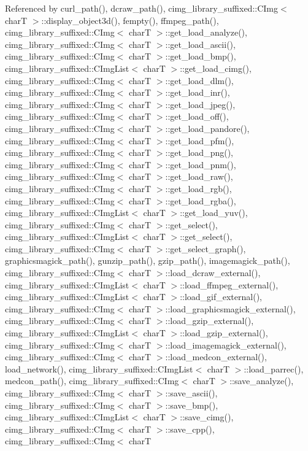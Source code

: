 Referenced by curl\+\_\+path(), dcraw\+\_\+path(), cimg\+\_\+library\+\_\+suffixed\+::\+C\+Img$<$ char\+T $>$\+::display\+\_\+object3d(), fempty(), ffmpeg\+\_\+path(), cimg\+\_\+library\+\_\+suffixed\+::\+C\+Img$<$ char\+T $>$\+::get\+\_\+load\+\_\+analyze(), cimg\+\_\+library\+\_\+suffixed\+::\+C\+Img$<$ char\+T $>$\+::get\+\_\+load\+\_\+ascii(), cimg\+\_\+library\+\_\+suffixed\+::\+C\+Img$<$ char\+T $>$\+::get\+\_\+load\+\_\+bmp(), cimg\+\_\+library\+\_\+suffixed\+::\+C\+Img\+List$<$ char\+T $>$\+::get\+\_\+load\+\_\+cimg(), cimg\+\_\+library\+\_\+suffixed\+::\+C\+Img$<$ char\+T $>$\+::get\+\_\+load\+\_\+dlm(), cimg\+\_\+library\+\_\+suffixed\+::\+C\+Img$<$ char\+T $>$\+::get\+\_\+load\+\_\+inr(), cimg\+\_\+library\+\_\+suffixed\+::\+C\+Img$<$ char\+T $>$\+::get\+\_\+load\+\_\+jpeg(), cimg\+\_\+library\+\_\+suffixed\+::\+C\+Img$<$ char\+T $>$\+::get\+\_\+load\+\_\+off(), cimg\+\_\+library\+\_\+suffixed\+::\+C\+Img$<$ char\+T $>$\+::get\+\_\+load\+\_\+pandore(), cimg\+\_\+library\+\_\+suffixed\+::\+C\+Img$<$ char\+T $>$\+::get\+\_\+load\+\_\+pfm(), cimg\+\_\+library\+\_\+suffixed\+::\+C\+Img$<$ char\+T $>$\+::get\+\_\+load\+\_\+png(), cimg\+\_\+library\+\_\+suffixed\+::\+C\+Img$<$ char\+T $>$\+::get\+\_\+load\+\_\+pnm(), cimg\+\_\+library\+\_\+suffixed\+::\+C\+Img$<$ char\+T $>$\+::get\+\_\+load\+\_\+raw(), cimg\+\_\+library\+\_\+suffixed\+::\+C\+Img$<$ char\+T $>$\+::get\+\_\+load\+\_\+rgb(), cimg\+\_\+library\+\_\+suffixed\+::\+C\+Img$<$ char\+T $>$\+::get\+\_\+load\+\_\+rgba(), cimg\+\_\+library\+\_\+suffixed\+::\+C\+Img\+List$<$ char\+T $>$\+::get\+\_\+load\+\_\+yuv(), cimg\+\_\+library\+\_\+suffixed\+::\+C\+Img$<$ char\+T $>$\+::get\+\_\+select(), cimg\+\_\+library\+\_\+suffixed\+::\+C\+Img\+List$<$ char\+T $>$\+::get\+\_\+select(), cimg\+\_\+library\+\_\+suffixed\+::\+C\+Img$<$ char\+T $>$\+::get\+\_\+select\+\_\+graph(), graphicsmagick\+\_\+path(), gunzip\+\_\+path(), gzip\+\_\+path(), imagemagick\+\_\+path(), cimg\+\_\+library\+\_\+suffixed\+::\+C\+Img$<$ char\+T $>$\+::load\+\_\+dcraw\+\_\+external(), cimg\+\_\+library\+\_\+suffixed\+::\+C\+Img\+List$<$ char\+T $>$\+::load\+\_\+ffmpeg\+\_\+external(), cimg\+\_\+library\+\_\+suffixed\+::\+C\+Img\+List$<$ char\+T $>$\+::load\+\_\+gif\+\_\+external(), cimg\+\_\+library\+\_\+suffixed\+::\+C\+Img$<$ char\+T $>$\+::load\+\_\+graphicsmagick\+\_\+external(), cimg\+\_\+library\+\_\+suffixed\+::\+C\+Img$<$ char\+T $>$\+::load\+\_\+gzip\+\_\+external(), cimg\+\_\+library\+\_\+suffixed\+::\+C\+Img\+List$<$ char\+T $>$\+::load\+\_\+gzip\+\_\+external(), cimg\+\_\+library\+\_\+suffixed\+::\+C\+Img$<$ char\+T $>$\+::load\+\_\+imagemagick\+\_\+external(), cimg\+\_\+library\+\_\+suffixed\+::\+C\+Img$<$ char\+T $>$\+::load\+\_\+medcon\+\_\+external(), load\+\_\+network(), cimg\+\_\+library\+\_\+suffixed\+::\+C\+Img\+List$<$ char\+T $>$\+::load\+\_\+parrec(), medcon\+\_\+path(), cimg\+\_\+library\+\_\+suffixed\+::\+C\+Img$<$ char\+T $>$\+::save\+\_\+analyze(), cimg\+\_\+library\+\_\+suffixed\+::\+C\+Img$<$ char\+T $>$\+::save\+\_\+ascii(), cimg\+\_\+library\+\_\+suffixed\+::\+C\+Img$<$ char\+T $>$\+::save\+\_\+bmp(), cimg\+\_\+library\+\_\+suffixed\+::\+C\+Img\+List$<$ char\+T $>$\+::save\+\_\+cimg(), cimg\+\_\+library\+\_\+suffixed\+::\+C\+Img$<$ char\+T $>$\+::save\+\_\+cpp(), cimg\+\_\+library\+\_\+suffixed\+::\+C\+Img$<$ char\+T 